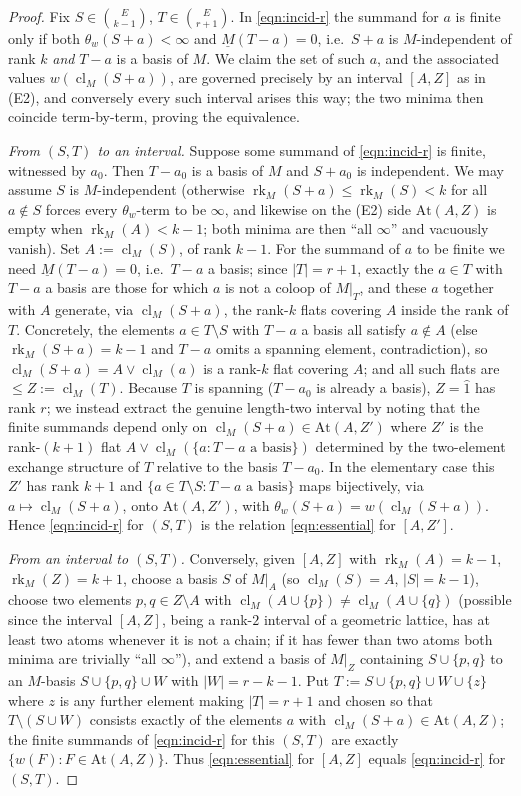 \documentclass{article}
\theoremstyle{definition}
\newcommand{\rk}{\operatorname{rk}}
\newcommand{\cl}{\operatorname{cl}}
\begin{document}
\begin{proof}
Fix $S\in\binom{E}{k-1}$, $T\in\binom{E}{r+1}$. In \eqref{eqn:incid-r} the summand for $a$ is finite
only if both $\theta_w(S+a)<\infty$ and $\underline M(T-a)=0$, i.e.\ $S+a$ is $M$-independent of rank
$k$ \emph{and} $T-a$ is a basis of $M$. We claim the set of such $a$, and the associated values
$w(\cl_M(S+a))$, are governed precisely by an interval $[A,Z]$ as in (E2), and conversely every such
interval arises this way; the two minima then coincide term-by-term, proving the equivalence.

\emph{From $(S,T)$ to an interval.} Suppose some summand of \eqref{eqn:incid-r} is finite, witnessed
by $a_0$. Then $T-a_0$ is a basis of $M$ and $S+a_0$ is independent. We may assume $S$ is
$M$-independent (otherwise $\rk_M(S+a)\le\rk_M(S)<k$ for all $a\notin S$ forces every $\theta_w$-term
to be $\infty$, and likewise on the (E2) side $\mathrm{At}(A,Z)$ is empty when $\rk_M(A)<k-1$; both
minima are then ``all $\infty$'' and vacuously vanish). Set $A:=\cl_M(S)$, of rank $k-1$. For the
summand of $a$ to be finite we need $\underline M(T-a)=0$, i.e.\ $T-a$ a basis; since $|T|=r+1$,
exactly the $a\in T$ with $T-a$ a basis are those for which $a$ is not a coloop of $M|_T$, and these
$a$ together with $A$ generate, via $\cl_M(S+a)$, the rank-$k$ flats covering $A$ inside the rank of
$T$. Concretely, the elements $a\in T\setminus S$ with $T-a$ a basis all satisfy $a\notin A$ (else
$\rk_M(S+a)=k-1$ and $T-a$ omits a spanning element, contradiction), so $\cl_M(S+a)=A\vee\cl_M(a)$ is
a rank-$k$ flat covering $A$; and all such flats are $\le Z:=\cl_M(T)$. Because $T$ is spanning
($T-a_0$ is already a basis), $Z=\hat1$ has rank $r$; we instead extract the genuine length-two
interval by noting that the finite summands depend only on $\cl_M(S+a)\in\mathrm{At}(A,Z')$ where
$Z'$ is the rank-$(k+1)$ flat $A\vee\cl_M(\{a:T-a\text{ a basis}\})$ determined by the two-element
exchange structure of $T$ relative to the basis $T-a_0$. In the elementary case this $Z'$ has rank
$k+1$ and $\{a\in T\setminus S:T-a\text{ a basis}\}$ maps bijectively, via $a\mapsto\cl_M(S+a)$, onto
$\mathrm{At}(A,Z')$, with $\theta_w(S+a)=w(\cl_M(S+a))$. Hence \eqref{eqn:incid-r} for $(S,T)$ is the
relation \eqref{eqn:essential} for $[A,Z']$.

\emph{From an interval to $(S,T)$.} Conversely, given $[A,Z]$ with $\rk_M(A)=k-1$,
$\rk_M(Z)=k+1$, choose a basis $S$ of $M|_A$ (so $\cl_M(S)=A$, $|S|=k-1$), choose two elements
$p,q\in Z\setminus A$ with $\cl_M(A\cup\{p\})\ne\cl_M(A\cup\{q\})$ (possible since the interval
$[A,Z]$, being a rank-$2$ interval of a geometric lattice, has at least two atoms whenever it is not
a chain; if it has fewer than two atoms both minima are trivially ``all $\infty$''), and extend a
basis of $M|_Z$ containing $S\cup\{p,q\}$ to an $M$-basis $S\cup\{p,q\}\cup W$ with $|W|=r-k-1$. Put
$T:=S\cup\{p,q\}\cup W\cup\{z\}$ where $z$ is any further element making $|T|=r+1$ and chosen so that
$T\setminus(S\cup W)$ consists exactly of the elements $a$ with $\cl_M(S+a)\in\mathrm{At}(A,Z)$; the
finite summands of \eqref{eqn:incid-r} for this $(S,T)$ are exactly $\{w(F):F\in\mathrm{At}(A,Z)\}$.
Thus \eqref{eqn:essential} for $[A,Z]$ equals \eqref{eqn:incid-r} for $(S,T)$.


\end{proof}
\end{document}

